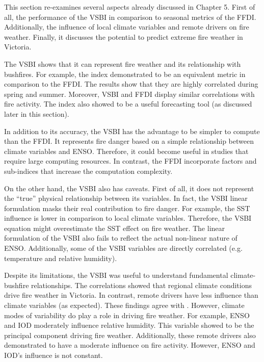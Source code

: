 This section re-examines several aspects already discussed in Chapter
5. First of all, the performance of the VSBI in comparison to seasonal
metrics of the FFDI. Additionally, the influence of local climate
variables and remote drivers on fire weather. Finally, it discusses
the potential to predict extreme fire weather in Victoria.

The VSBI shows that it can represent fire weather and its relationship
with bushfires. For example, the index demonstrated to be an equivalent
metric in comparison to the FFDI. The results show that they are highly
correlated during spring and summer. Moreover, VSBI and FFDI display
similar correlations with fire activity. The index also showed to
be a useful forecasting tool (as discussed later in this section). 

In addition to its accuracy, the VSBI has the advantage to be simpler
to compute than the FFDI. It represents fire danger based on a simple
relationship between climate variables and ENSO. Therefore, it could
become useful in studies that require large computing resources. In
contrast, the FFDI incorporate factors and sub-indices that increase
the computation complexity.

On the other hand, the VSBI also has caveats. First of all, it does
not represent the ``true'' physical relationship between its variables.
In fact, the VSBI linear formulation masks their real contribution
to fire danger. For example, the SST influence is lower in comparison
to local climate variables. Therefore, the VSBI equation might overestimate
the SST effect on fire weather. The linear formulation of the VSBI
also fails to reflect the actual non-linear nature of ENSO. Additionally,
some of the VSBI variables are directly correlated (e.g. temperature
and relative humidity). 

Despite its limitations, the VSBI was useful to understand fundamental
climate-bushfire relationships. The correlations showed that regional
climate conditions drive fire weather in Victoria. In contrast, remote
drivers have less influence than climate variables (as expected).
These findings agree with \citet{Harris2013}. However, climate modes
of variability do play a role in driving fire weather. For example,
ENSO and IOD moderately influence relative humidity. This variable
showed to be the principal component driving fire weather. Additionally,
these remote drivers also demonstrated to have a moderate influence
on fire activity. However, ENSO and IOD's influence is not constant. 

